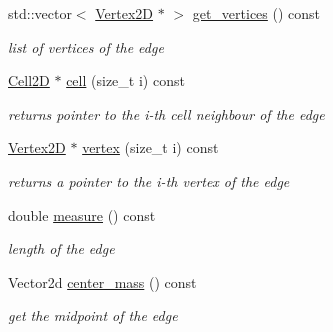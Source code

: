 \begin{DoxyCompactItemize}
\mbox{\label{classHCore2D_1_1Edge2D_ad2b7c14cdbb0c590c705326dd26162b1}} 
std\+::vector$<$ \hyperlink{classHCore2D_1_1Vertex2D}{Vertex2D} $\ast$ $>$ \hyperlink{classHCore2D_1_1Edge2D_ad2b7c14cdbb0c590c705326dd26162b1}{get\+\_\+vertices} () const
\begin{DoxyCompactList}\small\item\em list of vertices of the edge \end{DoxyCompactList}\item 
\mbox{\label{classHCore2D_1_1Edge2D_aec9ba58af7a02bd31c4275edde79b5c6}} 
\hyperlink{classHCore2D_1_1Cell2D}{Cell2D} $\ast$ \hyperlink{classHCore2D_1_1Edge2D_aec9ba58af7a02bd31c4275edde79b5c6}{cell} (size\+\_\+t i) const
\begin{DoxyCompactList}\small\item\em returns pointer to the i-\/th cell neighbour of the edge \end{DoxyCompactList}\item 
\mbox{\label{classHCore2D_1_1Edge2D_a20b8b1ab2f6e8ad195c556a7fac02995}} 
\hyperlink{classHCore2D_1_1Vertex2D}{Vertex2D} $\ast$ \hyperlink{classHCore2D_1_1Edge2D_a20b8b1ab2f6e8ad195c556a7fac02995}{vertex} (size\+\_\+t i) const
\begin{DoxyCompactList}\small\item\em returns a pointer to the i-\/th vertex of the edge \end{DoxyCompactList}\item 
\mbox{\label{classHCore2D_1_1Edge2D_a31769e23163cddee4bacfdbd8278095b}} 
double \hyperlink{classHCore2D_1_1Edge2D_a31769e23163cddee4bacfdbd8278095b}{measure} () const
\begin{DoxyCompactList}\small\item\em length of the edge \end{DoxyCompactList}\item 
\mbox{\label{classHCore2D_1_1Edge2D_a421c56ef905bf37afde949a3bfb75644}} 
Vector2d \hyperlink{classHCore2D_1_1Edge2D_a421c56ef905bf37afde949a3bfb75644}{center\+\_\+mass} () const
\begin{DoxyCompactList}\small\item\em get the midpoint of the edge \end{DoxyCompactList}\item 

\end{DoxyCompactItemize}
